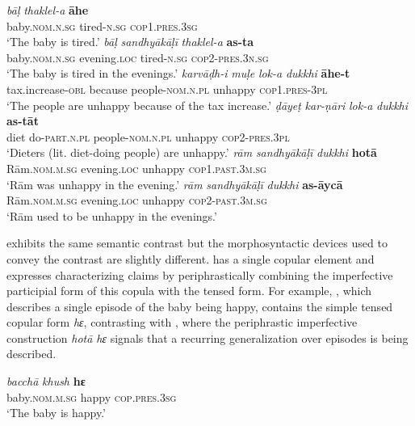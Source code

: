 \documentclass[output=paper,hidelinks]{langscibook}
\begin{document}
\ea \label{mar1}
\ea
\gll \emph{bāḷ} \emph{thaklel-a} \textbf{āhe}\\
baby.\textsc{nom.n.sg} tired-\textsc{n.sg} \textsc{cop1.pres.3sg}\\
\glt `The baby is tired.' \label{mar1a}
\ex
\gll \emph{bāḷ} \emph{sandhyākāḷī} \emph{thaklel-a} \textbf{ as-ta}\\
baby.\textsc{nom.n.sg} evening.\textsc{loc} tired-\textsc{n.sg} \textsc{cop2-pres.3n.sg}\\
\glt `The baby is tired in the evenings.' \label{mar1b}
\z
\ex \label{mar2}
\ea
\gll \emph{karvāḍh-i} \emph{muḷe} \emph{lok-a} \emph{dukkhi} \textbf{āhe-t}\\
tax.increase-\textsc{obl} because people-\textsc{nom.n.pl} unhappy \textsc{cop1.pres-3pl}\\
\glt `The people are unhappy because of the tax increase.'
\ex
\gll \emph{ḍāyeṭ} \emph{kar-ṇāri} \emph{lok-a} \emph{dukkhi} \textbf{as-tāt}\\
diet do-\textsc{part.n.pl} people-\textsc{nom.n.pl} unhappy \textsc{cop2-pres.3pl}\\
\glt `Dieters (lit. diet-doing people) are unhappy.'
\z
\ex \label{mar3}
\ea
\gll \emph{rām} \emph{sandhyākāḷī} \emph{dukkhi} \textbf{hotā}\\
Rām.\textsc{nom.m.sg} evening.\textsc{loc} unhappy \textsc{cop1.past.3m.sg}\\
\glt `Rām was unhappy in the evening.'
\ex 
\gll \emph{rām} \emph{sandhyākāḷī} \emph{dukkhi} \textbf{as-āycā}\\
Rām.\textsc{nom.m.sg} evening.\textsc{loc} unhappy \textsc{cop2-past.3m.sg}\\
\glt `Rām used to be unhappy in the evenings.'
\z
\z

 exhibits the same semantic contrast but the morphosyntactic devices used to convey the contrast are slightly different.  has a single copular element and expresses characterizing claims by periphrastically combining the imperfective participial form of this copula with the tensed form. For example, , which describes a single episode of the baby being happy, contains the simple tensed copular form \emph{hɛ}, contrasting with , where the periphrastic imperfective construction \emph{hotā hɛ} signals that a recurring generalization over episodes is being described.

\ea \label{hin1}
\ea
\gll \emph{bacchā} \emph{khush} \textbf{hɛ}\\
baby.\textsc{nom.m.sg} happy \textsc{cop.pres.3sg}\\
\glt `The baby is happy.' \label{hin1a}
\end{document}
